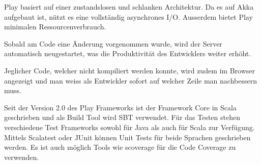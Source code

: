 Play basiert auf einer zustandslosen und schlanken Architektur. Da es auf Akka aufgebaut ist, nützt es eine vollständig asynchrones I/O. Ausserdem bietet Play minimalen Ressourcenverbrauch. 

Sobald am Code eine Änderung vorgenommen wurde, wird der Server automatisch neugestartet, was die Produktivität des Entwicklers  weiter erhöht.

Jeglicher Code, welcher nicht kompiliert werden konnte, wird zudem im Browser angezeigt und man weiss als Entwickler sofort auf welcher Zeile man nachbessern muss. 

Seit der Version 2.0 des Play Frameworks ist der Framework Core in Scala geschrieben und als Build Tool wird SBT verwendet. Für das Testen stehen verschiedene Test Frameworks sowohl für Java als auch für Scala zur Verfügung. Mittels Scalatest oder JUnit können Unit Tests für beide Sprachen geschrieben werden. Es ist auch möglich Tools wie scoverage für die Code Coverage zu verwenden. 
